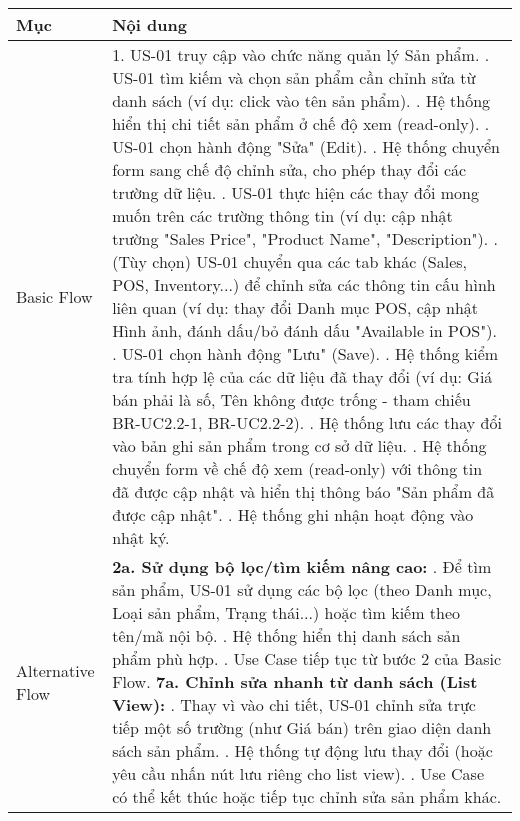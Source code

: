 \begin{longtable}{|m{4cm}|p{11cm}|}
\hline
\textbf{Mục} & \textbf{Nội dung} \\
\hline
Basic Flow & 1. US-01 truy cập vào chức năng quản lý Sản phẩm. \newline 2. US-01 tìm kiếm và chọn sản phẩm cần chỉnh sửa từ danh sách (ví dụ: click vào tên sản phẩm). \newline 3. Hệ thống hiển thị chi tiết sản phẩm ở chế độ xem (read-only). \newline 4. US-01 chọn hành động "Sửa" (Edit). \newline 5. Hệ thống chuyển form sang chế độ chỉnh sửa, cho phép thay đổi các trường dữ liệu. \newline 6. US-01 thực hiện các thay đổi mong muốn trên các trường thông tin (ví dụ: cập nhật trường "Sales Price", "Product Name", "Description"). \newline 7. (Tùy chọn) US-01 chuyển qua các tab khác (Sales, POS, Inventory...) để chỉnh sửa các thông tin cấu hình liên quan (ví dụ: thay đổi Danh mục POS, cập nhật Hình ảnh, đánh dấu/bỏ đánh dấu "Available in POS"). \newline 8. US-01 chọn hành động "Lưu" (Save). \newline 9. Hệ thống kiểm tra tính hợp lệ của các dữ liệu đã thay đổi (ví dụ: Giá bán phải là số, Tên không được trống - tham chiếu BR-UC2.2-1, BR-UC2.2-2). \newline 10. Hệ thống lưu các thay đổi vào bản ghi sản phẩm trong cơ sở dữ liệu. \newline 11. Hệ thống chuyển form về chế độ xem (read-only) với thông tin đã được cập nhật và hiển thị thông báo "Sản phẩm đã được cập nhật". \newline 12. Hệ thống ghi nhận hoạt động vào nhật ký. \\
\hline
Alternative Flow & \textbf{2a. Sử dụng bộ lọc/tìm kiếm nâng cao:} \newline    1. Để tìm sản phẩm, US-01 sử dụng các bộ lọc (theo Danh mục, Loại sản phẩm, Trạng thái...) hoặc tìm kiếm theo tên/mã nội bộ. \newline    2. Hệ thống hiển thị danh sách sản phẩm phù hợp. \newline    3. Use Case tiếp tục từ bước 2 của Basic Flow. \newline \textbf{7a. Chỉnh sửa nhanh từ danh sách (List View):} \newline    1. Thay vì vào chi tiết, US-01 chỉnh sửa trực tiếp một số trường (như Giá bán) trên giao diện danh sách sản phẩm. \newline    2. Hệ thống tự động lưu thay đổi (hoặc yêu cầu nhấn nút lưu riêng cho list view). \newline    3. Use Case có thể kết thúc hoặc tiếp tục chỉnh sửa sản phẩm khác. \\

\end{longtable}
